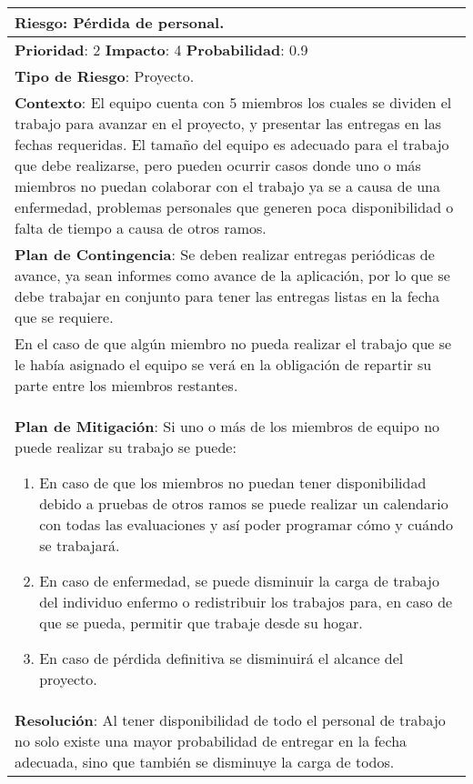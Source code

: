 \begin{table}[H]
  \centering
  \begin{tabular}{|p{15cm}|}\hline
    {\bf Riesgo}: Pérdida de personal.\\\hline
    {\bf Prioridad}: 2  {\bf Impacto}: 4  {\bf Probabilidad}: 0.9\\\hline
    {\bf Tipo de Riesgo}: Proyecto.\\\hline
    {\bf Contexto}: El equipo cuenta con 5 miembros los cuales se dividen el trabajo para avanzar en el proyecto, y presentar las entregas en las fechas requeridas. El tamaño del equipo es adecuado para el trabajo que debe realizarse, pero pueden ocurrir casos donde uno o más miembros no puedan colaborar con el trabajo ya se a  causa de una enfermedad, problemas personales que generen poca disponibilidad o falta de tiempo a causa de otros ramos.\\\hline
    {\bf Plan de Contingencia}: Se deben realizar entregas periódicas de avance, ya sean informes como avance de la aplicación, por lo que se debe trabajar en conjunto para tener las entregas listas en la fecha que se requiere.\\En el caso de que algún miembro no pueda realizar el trabajo que se le había asignado el equipo se verá en la obligación de repartir su parte entre los miembros restantes.\\\hline
    {\bf Plan de Mitigación}: Si uno o más de los miembros de equipo no puede realizar su trabajo se puede:\begin{enumerate}\item En caso de que los miembros no puedan tener disponibilidad debido a pruebas de otros ramos se puede realizar un calendario con todas las evaluaciones y así poder programar cómo y cuándo se trabajará.\item En caso de enfermedad, se puede disminuir la carga de trabajo del individuo enfermo o redistribuir los trabajos para, en caso de que se pueda, permitir que trabaje desde su hogar.\item En caso de pérdida definitiva se disminuirá el alcance del proyecto.\end{enumerate}\\\hline
    {\bf Resolución}: Al tener disponibilidad de todo el personal de trabajo no solo existe una mayor probabilidad de entregar en la fecha adecuada, sino que también se disminuye la carga de todos.\\\hline
  \end{tabular}
  \label{table:R6}
\end{table}


